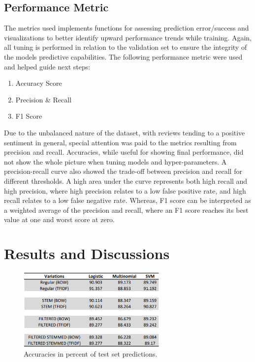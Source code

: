 \documentclass[conference]{IEEEtran}
\begin{document}
\subsection{Performance Metric}
The metrics used implements functions for assessing prediction error/success and visualizations to better identify upward performance trends while training. Again, all tuning is performed in relation to the validation set to ensure the integrity of the models predictive capabilities. The following performance metric were used and helped guide next steps:
\begin{enumerate}
\item Accuracy Score
\item Precision \& Recall
\item F1 Score
\end{enumerate}
Due to the unbalanced nature of the dataset, with reviews tending to a positive sentiment in general, special attention was paid to the metrics resulting from precision and recall. Accuracies, while useful for showing final performance, did not show the whole picture when tuning models and hyper-parameters. A precision-recall curve also showed the trade-off between precision and recall for different thresholds. A high area under the curve represents both high recall and high precision, where high precision relates to a low false positive rate, and high recall relates to a low false negative rate. Whereas, F1 score can be interpreted as a weighted average of the precision and recall, where an F1 score reaches its best value at one and worst score at zero.

\section{Results and Discussions}
\begin{figure}[htbp]
\centerline{\includegraphics[width=0.9\columnwidth , height=4cm]{test-prediction-main.png}}
\caption{Accuracies in percent of test set predictions.}
\label{fig}
\end{figure}
\end{document}
